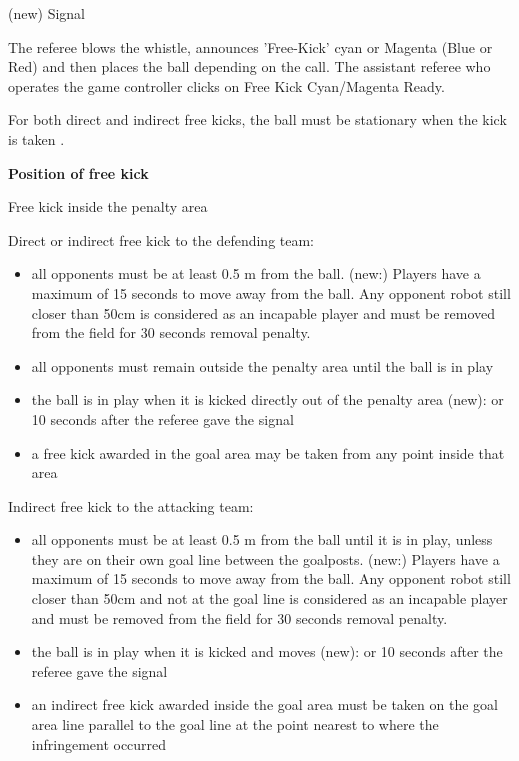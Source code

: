 {\headlinebox

(new) Signal

The referee blows the whistle, announces 'Free-Kick' cyan or Magenta (Blue or Red) and then  places the ball depending on the call. The assistant referee who operates the game controller clicks on Free Kick Cyan/Magenta Ready. 

For both direct and indirect free kicks, the ball must be stationary when the kick is taken 
.

\bigskip

{\bfseries Position of free kick }

\headlinebox

Free kick inside the penalty area

Direct or indirect free kick to the defending team:

\begin{itemize}
\item all opponents must be at least 0.5 m from the ball. (new:) Players have a maximum of 15 seconds to move away from the ball. Any opponent robot still closer than 50cm is considered as an incapable player and must be removed from the field for 30 seconds removal penalty.
\item all opponents must remain outside the penalty area until the ball is in play
\item the ball is in play when it is kicked directly out of the penalty area (new): or 10 seconds after the referee gave the signal
\item a free kick awarded in the goal area may be taken from any point inside that area
\end{itemize}

\bigskip

Indirect free kick to the attacking team:

\begin{itemize}
\item all opponents must be at least 0.5 m from the ball until it is in play, unless they are on their own goal line between the goalposts. (new:) Players have a maximum of 15 seconds to move away from the ball. Any opponent robot still closer than 50cm and not at the goal line is considered as an incapable player and must be removed from the field for 30 seconds removal penalty.
\item the ball is in play when it is kicked and moves (new): or 10 seconds after the referee gave the signal
\item an indirect free kick awarded inside the goal area must be taken on the goal area line parallel to the goal line at the point nearest to where the infringement occurred
\end{itemize}

}
